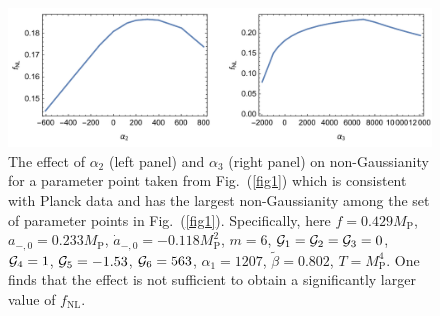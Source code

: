 \documentclass[a4paper,11pt]{article}
\begin{document}
  \begin{figure}
  	\centering
  	\includegraphics[width=1.0\textwidth]{figs/fig3.pdf}
  	\caption{The effect of $\alpha_2$ (left panel) and $\alpha_3$ (right panel) on non-Gaussianity for a parameter point 
	taken from Fig.~(\ref{fig1}) which is consistent with 
	Planck data and has the  largest non-Gaussianity among the set of parameter points 
  in Fig.~(\ref{fig1}). Specifically, here $f = 0.429 M_\text{P}$, $a_{-, 0} = 0.233 M_\text{P}$, $\dot a_{-, 0} = -0.118 M_\text{P}^2$, $m = 6$, ${\cal{G}}_1 = {\cal{G}}_2 = {\cal{G}}_3 = 0$, ${\cal{G}}_4 = 1$, ${\cal{G}}_5 = -1.53$, ${\cal{G}}_6 = 563$, $\alpha_1 = 1207$, $\tilde \beta = 0.802$, $T = M_\text{P}^4$. One 
	finds that 
	 the effect is not sufficient to obtain a significantly larger value of $f_\text{NL}$.}
  	\label{fig3}
  \end{figure}
\end{document}
